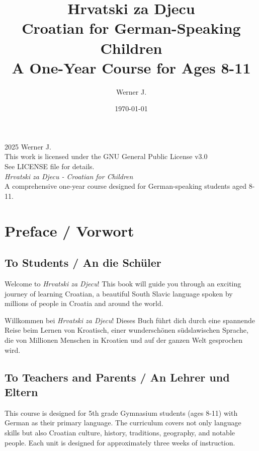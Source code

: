 \documentclass[11pt,a4paper,twoside]{book}
\title{\Huge\textbf{Hrvatski za Djecu}\\[0.5cm]
\Large Croatian for German-Speaking Children\\[0.3cm]
\large A One-Year Course for Ages 8-11}
\author{Werner J.}
\date{\today}
\begin{document}
\maketitle

\thispagestyle{empty}
\vspace*{\fill}
\begin{center}
\textcopyright{} 2025 Werner J.\\[0.5cm]
This work is licensed under the GNU General Public License v3.0\\
See LICENSE file for details.\\[1cm]
\textit{Hrvatski za Djecu - Croatian for Children}\\
A comprehensive one-year course designed for German-speaking students aged 8-11.
\end{center}
\vspace*{\fill}
\clearpage

\tableofcontents
\clearpage

\chapter*{Preface / Vorwort}

\section*{To Students / An die Schüler}
Welcome to \textit{Hrvatski za Djecu}! This book will guide you through an exciting journey of learning Croatian, a beautiful South Slavic language spoken by millions of people in Croatia and around the world.

Willkommen bei \textit{Hrvatski za Djecu}! Dieses Buch führt dich durch eine spannende Reise beim Lernen von Kroatisch, einer wunderschönen südslawischen Sprache, die von Millionen Menschen in Kroatien und auf der ganzen Welt gesprochen wird.

\section*{To Teachers and Parents / An Lehrer und Eltern}
This course is designed for 5th grade Gymnasium students (ages 8-11) with German as their primary language. The curriculum covers not only language skills but also Croatian culture, history, traditions, geography, and notable people. Each unit is designed for approximately three weeks of instruction.
\end{document}
